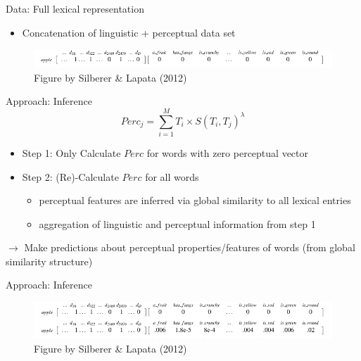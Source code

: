 \documentclass[12pt,a4paper]{beamer}
\begin{document}
\begin{frame}{Data: Full lexical representation}
\begin{itemize}
\item Concatenation of linguistic + perceptual data set
\end{itemize}
\begin{figure}
\includegraphics[width=\textwidth]{silber_lapata_example_lexical_representation_figure_3.png}
\caption{Figure by Silberer \& Lapata (2012)}
\end{figure}
\end{frame}


\begin{frame}{Approach: Inference}
$$ Perc_{j} = \sum_{i=1}^{M}{T_{i} \times S(T_{i}, T_{j})^{\lambda} } $$
\begin{itemize}
\item Step 1: Only Calculate $Perc$ for words with zero perceptual vector
\item Step 2: (Re)-Calculate $Perc$ for all words
    \begin{itemize}
    \item perceptual features are inferred via global similarity to all lexical entries
    \item aggregation of linguistic and perceptual information from step 1
    \end{itemize}
\end{itemize}
$\to$ Make predictions about perceptual properties/features of words (from global similarity structure)
\end{frame}

\begin{frame}{Approach: Inference}
\begin{figure}
\includegraphics[width=\textwidth]{silber_lapata_example_lexical_representation_and_inference_figure_3.png}
\caption{Figure by Silberer \& Lapata (2012)}
\end{figure}
\end{frame}
\end{document}
